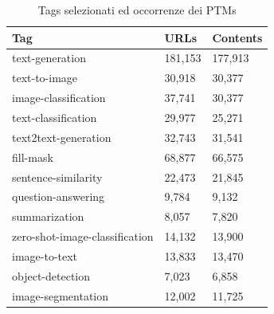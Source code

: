 \documentclass{article}
\begin{document}
\begin{table}[htbp]
\small
    \centering    
    \caption{Tags selezionati ed occorrenze dei PTMs}
    \label{tab:tags2}
    \begin{tabular}{|l|l|l|}
    \hline
            Tag & URLs & Contents \\ \hline
            text-generation & 181,153 & 177,913\\ 
            text-to-image & 30,918 & 30,377\\ 
            image-classification & 37,741 & 30,377\\ 
            text-classification & 29,977 & 25,271\\ 
            text2text-generation & 32,743 & 31,541\\ 
            fill-mask & 68,877 & 66,575\\ 
            sentence-similarity & 22,473 & 21,845\\ 
            question-answering & 9,784 & 9,132\\ 
            summarization & 8,057 & 7,820\\ 
            zero-shot-image-classification & 14,132 & 13,900\\ 
            image-to-text & 13,833 & 13,470\\ 
            object-detection & 7,023 & 6,858\\ 
            image-segmentation & 12,002 & 11,725\\ \hline
    \end{tabular}
\end{table}
\end{document}
